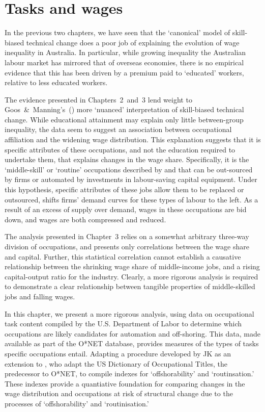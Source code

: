 \setcounter{page}{32}
\chapter{Tasks and wages}

In the previous two chapters, we have seen that the `canonical' model of skill-biased technical change does a poor job of explaining the evolution of wage inequality in Australia. In particular, while growing inequality the Australian labour market has mirrored that of overseas economies, there is no empirical evidence that this has been driven by a premium paid to `educated' workers, relative to less educated workers. 

The evidence presented in Chapters~2~and~3 lend weight to Goos~\&~Manning's~(\citeyear{Goos2007}) more `nuanced' interpretation of skill-biased technical change. While educational attainment may explain only little between-group inequality, the data seem to suggest an association between occupational affiliation and the widening wage distribution. This explanation suggests that it is specific attributes of these occupations, and not the education required to undertake them, that explains changes in the wage share. Specifically, it is the `middle-skill' or `routine' occupations described by \citet{Levy2003} and \citet{Goos2009} that can be out-sourced by firms or automated by investments in labour-saving capital equipment. Under this hypothesis, specific attributes of these jobs allow them to be replaced or outsourced, shifts firms' demand curves for these types of labour to the left. As a result of an excess of supply over demand, wages in these occupations are bid down, and wages are both compressed and reduced. 

The analysis presented in Chapter~3 relies on a somewhat arbitrary three-way division of occupations, and presents only correlations between the wage share and capital. Further, this statistical correlation cannot establish a causative relationship between the shrinking wage share of middle-income jobs, and a rising capital-output ratio for the industry. Clearly, a more rigorous analysis is required to demonstrate a clear relationship between tangible properties of middle-skilled jobs and falling wages.

In this chapter, we present a more rigorous analysis, using data on occupational task content compiled by the U.S. Department of Labor to determine which occupations are likely candidates for automation and off-shoring. This data, made available as part of the O*NET database, provides measures of the types of tasks specific occupations entail. Adapting a procedure developed by JK as an extension to \citet{Levy2003}, who adapt the US Dictionary of Occupational Titles, the predecessor to O*NET, to compile indexes for `offshorability' and `routinsation.' These indexes provide a quantiative foundation for comparing changes in the wage distribution and occupations at risk of structural change due to the processes of `offshorability' and `routinisation.'

